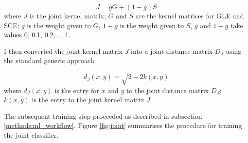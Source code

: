 \begin{equation}
    J = gG + (1-g)S
    \label{eq:joint}
\end{equation}
where $J$ is the joint kernel matrix; $G$ and $S$ are the kernel matrices for GLE and SCE; $g$ is the weight given to $G$, $1-g$ is the weight given to $S$, $g$ and $1-g$ take values 0, 0.1, 0.2,..., 1.

I then converted the joint kernel matrix $J$ into a joint distance matrix $D_J$ using the standard generic approach \citep[more in the appendix equation \ref{eq:k2d_ori};][]{Phillips20112Distance}

\begin{equation}
    d_J(x,y) = \sqrt{2 - 2k(x,y)}
    \label{eq:k2d}
\end{equation}
where $d_J(x,y)$ is the entry for $x$ and $y$ to the joint distance matrix $D_J$; $k(x,y)$ is the entry to the joint kernel matrix $J$.

The subsequent training step proceeded as described in subsection \ref{methods:ml_workflow}. Figure \ref{fig:joint} summarises the procedure for training the joint classifier.














































